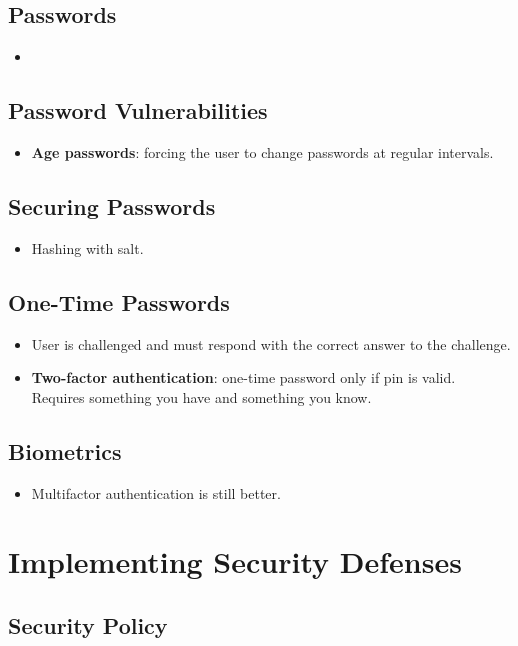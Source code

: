 \documentclass[10pt]{report}
\begin{document}
		\subsection{Passwords}
			\begin{itemize}
				\item
			\end{itemize}

		\subsection{Password Vulnerabilities}
			\begin{itemize}
				\item \textbf{Age passwords}: forcing the user to change passwords at regular intervals.
			\end{itemize}

		\subsection{Securing Passwords}
			\begin{itemize}
				\item Hashing with salt.
			\end{itemize}

		\subsection{One-Time Passwords}
			\begin{itemize}
				\item User is challenged and must respond with the correct answer to the challenge.
				\item \textbf{Two-factor authentication}: one-time password only if pin is valid. Requires something you have and something you know.
			\end{itemize}

		\subsection{Biometrics}
			\begin{itemize}
				\item Multifactor authentication is still better.
			\end{itemize}

	\section{Implementing Security Defenses}
		\subsection{Security Policy}
\end{document}
